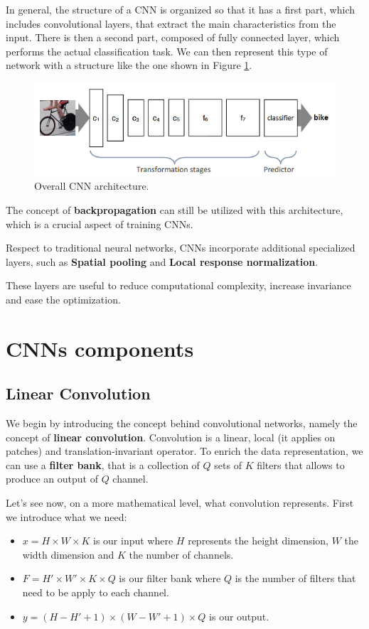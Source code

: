 In general, the structure of a CNN is organized so that it has a first part,
which includes convolutional layers, that extract the main characteristics from
the input. There is then a second part, composed of fully connected layer, which
performs the actual classification task. We can then represent this type of
network with a structure like the one shown in Figure \ref{fig:cnnarc}.

\begin{figure}[!ht]
    \centering
    \includegraphics[width=\linewidth]{img/CNN/CNNarc.png}
    \caption{Overall CNN architecture.}
    \label{fig:cnnarc}
\end{figure}

The concept of \textbf{backpropagation} can still be utilized with this
architecture, which is a crucial aspect of training CNNs.

Respect to traditional neural networks, CNNs incorporate additional specialized
layers, such as \textbf{Spatial pooling} and \textbf{Local response normalization}.

These layers are useful to reduce computational complexity, increase invariance
and ease the optimization.
\section{CNNs components}
\subsection{Linear Convolution}
We begin by introducing the concept behind convolutional networks, namely the
concept of \textbf{linear convolution}. Convolution is a linear, local
(it applies on patches) and translation-invariant operator. To enrich the data
representation, we can use a \textbf{filter bank}, that is a collection of $Q$
sets of $K$ filters that allows to produce an output of $Q$ channel.

Let's see now, on a more mathematical level, what convolution represents. First we
introduce what we need:
\begin{itemize}
    \item $x = H \times W \times K$ is our input where $H$ represents the height
          dimension, $W$ the width dimension and $K$ the number of channels.
    \item $F = H' \times W' \times K \times Q$ is our filter bank where $Q$ is
          the number of filters that need to be apply to each channel.
    \item $y = (H - H' + 1) \times (W - W' + 1) \times Q$ is our output.
\end{itemize}

